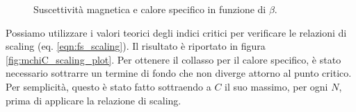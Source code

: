 \documentclass[a4paper,11pt]{article}
\begin{document}
	\begin{figure}[htb]
        \caption{Suscettività magnetica e calore specifico in funzione di $\beta$.}
        \label{fig:chiC_plot}
	\end{figure}
	
	Possiamo utilizzare i valori teorici degli indici critici per verificare le relazioni di scaling (eq. \ref{eqn:fs_scaling}). Il risultato è riportato in figura \ref{fig:mchiC_scaling_plot}. Per ottenere il collasso per il calore specifico, è stato necessario sottrarre un termine di fondo che non diverge attorno al punto critico. Per semplicità, questo è stato fatto sottraendo a $C$ il suo massimo, per ogni $N$, prima di applicare la relazione di scaling.
	
\end{document}
